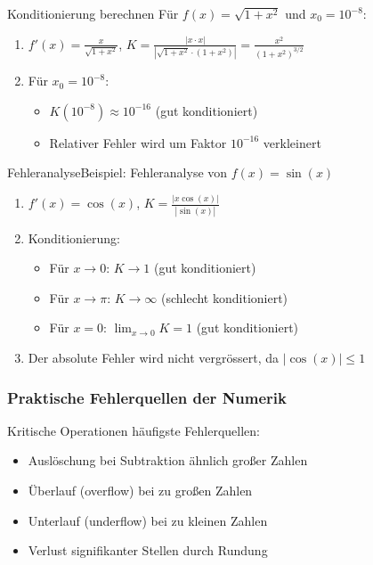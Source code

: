 \begin{example2}{Konditionierung berechnen}
Für $f(x) = \sqrt{1+x^2}$ und $x_0 = 10^{-8}$:
\begin{enumerate}
    \item $f'(x) = \frac{x}{\sqrt{1+x^2}}$, $K = \frac{|x \cdot x|}{|\sqrt{1+x^2} \cdot (1+x^2)|} = \frac{x^2}{(1+x^2)^{3/2}}$
    \item Für $x_0 = 10^{-8}$:
    \begin{itemize}
        \item $K(10^{-8}) \approx 10^{-16}$ (gut konditioniert)
        \item Relativer Fehler wird um Faktor $10^{-16}$ verkleinert
    \end{itemize}
\end{enumerate}
\end{example2}

\raggedcolumns

\begin{example2}{Fehleranalyse}Beispiel: Fehleranalyse von $f(x)=\sin(x)$
\begin{enumerate}
    \item $f'(x) = \cos(x)$, $K = \frac{|x\cos(x)|}{|\sin(x)|}$
    \item Konditionierung:
    \begin{itemize}
    \item Für $x \to 0$: $K \to 1$ (gut konditioniert)
    \item Für $x \to \pi$: $K \to \infty$ (schlecht konditioniert)
    \item Für $x = 0$: $\lim_{x \to 0} K = 1$ (gut konditioniert)
    \end{itemize}
    \item Der absolute Fehler wird nicht vergrössert, da $|\cos(x)| \leq 1$
\end{enumerate}
\end{example2}

\subsubsection{Praktische Fehlerquellen der Numerik}

\begin{concept}{Kritische Operationen} häufigste Fehlerquellen:
\begin{itemize}
    \item Auslöschung bei Subtraktion ähnlich großer Zahlen
    \item Überlauf (overflow) bei zu großen Zahlen
    \item Unterlauf (underflow) bei zu kleinen Zahlen
    \item Verlust signifikanter Stellen durch Rundung
\end{itemize}
\end{concept}

